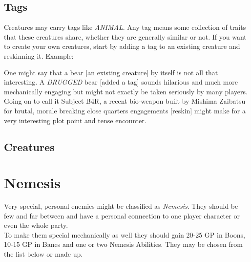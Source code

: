 \documentclass[12pt,a4paper,openany]{book}
\begin{document}
	\section{Tags}
	Creatures may carry tags like \emph{ANIMAL}. Any tag means some collection of traits that these creatures share, whether they are generally similar or not. If you want to create your own creatures, start by adding a tag to an existing creature and reskinning it. Example:\par
	\begin{exampleblock}
		One might say that a bear [an existing creature] by itself is not all that interesting. A \emph{DRUGGED} bear [added a tag] sounds hilarious and much more mechanically engaging but might not exactly be taken seriously by many players. Going on to call it Subject B4R, a recent bio-weapon built by Mishima Zaibatsu for brutal, morale breaking close quarters engagements [reskin] might make for a very interesting plot point and tense encounter.
	\end{exampleblock}
	
	\vspace{5mm}
	

	\section{Creatures}

	\chapter{Nemesis}
	Very special, personal enemies might be classified as \emph{Nemesis}. They should be few and far between and have a personal connection to one player character or even the whole party.\\
	To make them special mechanically as well they should gain 20-25 GP in Boons, 10-15 GP in Banes and one or two Nemesis Abilities. They may be chosen from the list below or made up.
\end{document}
